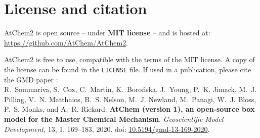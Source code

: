\section{License and citation} \label{sec:license-citation}

AtChem2 is open source -- under \textbf{MIT license} -- and is hosted at:\\
\href{https://github.com/AtChem/AtChem2}{https://github.com/AtChem/AtChem2}.

AtChem2 is free to use, compatible with the terms of the MIT
license. A copy of the license can be found in the \texttt{LICENSE}
file. If used in a publication, please cite the GMD paper \citep{sommariva_2020}:\\

R.~Sommariva, S.~Cox, C.~Martin, K.~Boro{\'n}ska, J.~Young, P.~K. Jimack,
M.~J. Pilling, V.~N. Matthaios, B.~S. Nelson, M.~J. Newland, M.~Panagi,
W.~J. Bloss, P.~S. Monks, and A.~R. Rickard.
\textbf{AtChem (version 1), an open-source box model for the Master Chemical Mechanism}.
\textit{Geoscientific Model Development}, 13, 1, 169--183, 2020.
doi: \href{https://doi.org/10.5194/gmd-13-169-2020}{10.5194/gmd-13-169-2020}.
